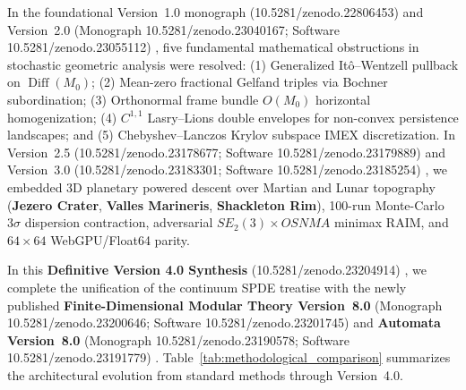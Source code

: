 \documentclass[11pt,a4paper,reqno]{article}
\def\texttt#1{#1}%
\def\mathrm#1{#1}%
\def\mathcal#1{#1}%
\def\zenodo#1{10.5281/zenodo.#1}%
\newcommand{\zenodo}[1]{\href{https://doi.org/10.5281/zenodo.#1}{\texttt{10.5281/\allowbreak zenodo.#1}}}
\theoremstyle{plain}
\theoremstyle{definition}
\theoremstyle{remark}
\numberwithin{equation}{section}
\begin{document}
In the foundational Version~1.0 monograph (\zenodo{22806453}) \cite{ghulame2026spde_v1} and Version~2.0 (Monograph \zenodo{23040167}; Software \zenodo{23055112}) \cite{ananda2026stochastic_fluid_v2, ananda2026stochastic_fluid_v2_software}, five fundamental mathematical obstructions in stochastic geometric analysis were resolved: (1) Generalized It\^o--Wentzell pullback on $\operatorname{Diff}(\mathcal{M}_0)$; (2) Mean-zero fractional Gelfand triples via Bochner subordination; (3) Orthonormal frame bundle $O(\mathcal{M}_0)$ horizontal homogenization; (4) $C^{1,1}$ Lasry--Lions double envelopes for non-convex persistence landscapes; and (5) Chebyshev--Lanczos Krylov subspace IMEX discretization. In Version~2.5 (\zenodo{23178677}; Software \zenodo{23179889}) \cite{ananda2026spde_v25} and Version~3.0 (\zenodo{23183301}; Software \zenodo{23185254}) \cite{ananda2026spde_v30}, we embedded 3D planetary powered descent over Martian and Lunar topography (\textbf{Jezero Crater}, \textbf{Valles Marineris}, \textbf{Shackleton Rim}), 100-run Monte-Carlo $3\sigma$ dispersion contraction, adversarial $\mathrm{SE}_2(3)\times\mathrm{OSNMA}$ minimax RAIM, and $64\times 64$ WebGPU/Float64 parity.

In this \textbf{Definitive Version 4.0 Synthesis} (\zenodo{23204914}) \cite{ananda2026spde_v40}, we complete the unification of the continuum SPDE treatise with the newly published \textbf{Finite-Dimensional Modular Theory Version~8.0} (Monograph \zenodo{23200646}; Software \zenodo{23201745}) \cite{ananda2026finite_v80} and \textbf{Automata Version~8.0} (Monograph \zenodo{23190578}; Software \zenodo{23191779}) \cite{ananda2026automata_v80}. Table~\ref{tab:methodological_comparison} summarizes the architectural evolution from standard methods through Version~4.0.
\end{document}

